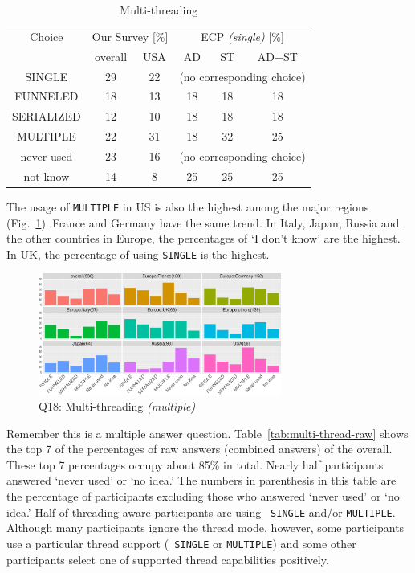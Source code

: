 \documentclass[conference,10pt,letterpaper]{IEEEtran}
\def\myquote#1{`#1'}
\begin{document}
\begin{table}[htb]%
  \begin{center}%
    \caption{Multi-threading}\label{tab:multi-thread}%
    \begin{tabular}{c||c|c||c|c|c}%
      \hline%
      Choice & \multicolumn{2}{c||}{Our Survey [\%]} & 
      \multicolumn{3}{c}{ECP {\it(single)} [\%]} \\
      \cline{2-6}%
      & overall & USA & AD & ST & AD+ST \\
      \hline%
      SINGLE & 29 & 22 & \multicolumn{3}{c}{\tiny (no corresponding choice)} \\
      FUNNELED & 18 & 13 & 18 & 18 & 18 \\
      SERIALIZED & 12 & 10 & 18 & 18 & 18 \\
      MULTIPLE & 22 & 31 & 18 & 32 & 25 \\
      never used & 23 & 16 & \multicolumn{3}{c}{\tiny (no corresponding choice)} \\
      not know & 14 & 8 & 25 & 25 & 25\\
      \hline%
    \end{tabular}%
  \end{center}%
\end{table}%

The usage of {\tt MULTIPLE} in US is also the highest among the major
regions (Fig.~\ref{fig:multi-thread}). France and Germany have the
same trend. In Italy, Japan, Russia and the
other countries in Europe, the percentages of \myquote{I don't know}
are the highest. In UK, the percentage of using {\tt SINGLE} is the
highest.

\begin{figure}[htb]
  \begin{center}
    \includegraphics[width=8cm]{R-scripts/Q18.pdf}
    \caption{Q18: Multi-threading {\it(multiple)}}
    \label{fig:multi-thread}
  \end{center}
\end{figure}

Remember this is a multiple answer
question. Table~\ref{tab:multi-thread-raw} shows the top 7 of the 
percentages of raw answers (combined answers) of the
overall. These top 7 percentages occupy about 85\% in
total. Nearly half 
participants answered \myquote{never used} or \myquote{no idea.} The
numbers in parenthesis in this table are the percentage of 
participants excluding those who answered \myquote{never used} or
\myquote{no idea.} Half of threading-aware participants are using {\tt
  SINGLE}
and/or {\tt MULTIPLE}. Although many participants ignore the thread
mode, however, some participants use a particular thread support ({\tt
  SINGLE} or {\tt MULTIPLE}) and some other participants select one of
supported thread capabilities positively. 
\end{document}

